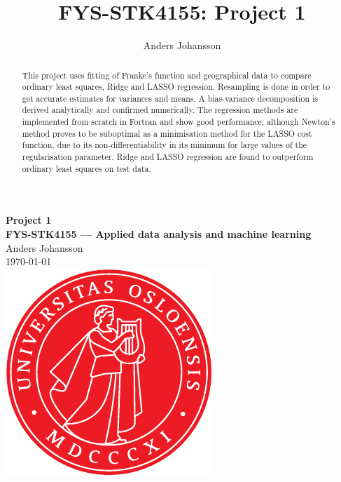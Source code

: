 \documentclass[11pt,british,a4paper]{article}
\numberwithin{equation}{section}
\begin{document}
\title{FYS-STK4155: Project 1}
\author{Anders Johansson}

\begin{titlepage}
\vspace*{\fill}
\begin{center}
\textsf{
    \Huge \textbf{Project 1}\\\vspace{0.5cm}
    \Large \textbf{FYS-STK4155 --- Applied data analysis and machine learning}\\
    \vspace{8cm}
    Anders Johansson\\
    \today\\
}
\vspace{1.5cm}
\includegraphics{uio.pdf}\\
\vspace*{\fill}
\end{center}
\end{titlepage}
\null
\pagestyle{empty}
\newpage

\pagestyle{fancy}
\setcounter{page}{1}

\begin{abstract}
    This project uses fitting of Franke's function and geographical data to compare ordinary least squares, Ridge and LASSO regression. Resampling is done in order to get accurate estimates for variances and means. A bias-variance decomposition is derived analytically and confirmed numerically. The regression methods are implemented from scratch in Fortran and show good performance, although Newton's method proves to be suboptimal as a minimisation method for the LASSO cost function, due to its non-differentiability in its minimum for large values of the regularisation parameter. Ridge and LASSO regression are found to outperform ordinary least squares on test data.
\end{abstract}
\end{document}
